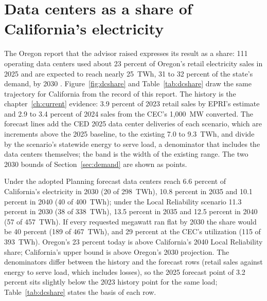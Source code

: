 \section{Data centers as a share of California's electricity}
\label{sec:dcshare}

The Oregon report that the advisor raised expresses its result as a share: 111 operating data centers used about 23 percent of Oregon's retail electricity sales in 2025 and are expected to reach nearly 25~TWh, 31 to 32 percent of the state's demand, by 2030 \citep{opb2026}. Figure~\ref{fig:dcshare} and Table~\ref{tab:dcshare} draw the same trajectory for California from the record of this report. The history is the chapter~\ref{ch:current} evidence: 3.9 percent of 2023 retail sales by EPRI's estimate and 2.9 to 3.4 percent of 2024 sales from the CEC's 1,000~MW converted. The forecast lines add the CED 2025 data center deliveries of each scenario, which are increments above the 2025 baseline, to the existing 7.0 to 9.3~TWh, and divide by the scenario's statewide energy to serve load, a denominator that includes the data centers themselves; the band is the width of the existing range. The two 2030 bounds of Section~\ref{sec:demand} are shown as points.

Under the adopted Planning forecast data centers reach 6.6 percent of California's electricity in 2030 (20 of 298~TWh), 10.8 percent in 2035 and 10.1 percent in 2040 (40 of 400~TWh); under the Local Reliability scenario 11.3 percent in 2030 (38 of 338~TWh), 13.5 percent in 2035 and 12.5 percent in 2040 (57 of 457~TWh). If every requested megawatt ran flat by 2030 the share would be 40 percent (189 of 467~TWh), and 29 percent at the CEC's utilization (115 of 393~TWh). Oregon's 23 percent today is above California's 2040 Local Reliability share; California's upper bound is above Oregon's 2030 projection. The denominators differ between the history and the forecast rows (retail sales against energy to serve load, which includes losses), so the 2025 forecast point of 3.2 percent sits slightly below the 2023 history point for the same load; Table~\ref{tab:dcshare} states the basis of each row.

\begin{table}[H]
\centering\scriptsize
\caption{Data centers as a share of California's electricity: history, the CED 2025 scenarios at 2025, 2030, 2035 and 2040, and the 2030 bounds, with the denominator of each row.}
\label{tab:dcshare}
\resizebox{\textwidth}{!}{}
\end{table}

